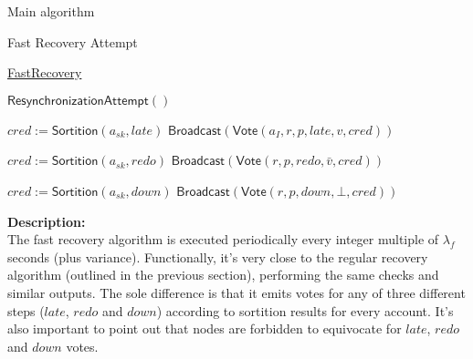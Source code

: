 \documentclass[10pt,a4paper]{article}
\begin{document}
\begin{section}{Main algorithm}
\begin{subsection}{Fast Recovery Attempt}
    \begin{algorithm}[H]
        \caption{\underline{FastRecovery}}
        \label{algo:fast-recovery}
        \begin{algorithmic}[1]


        \State $\mathsf{ResynchronizationAttempt}()$
    
                \State $cred := 
                \mathsf{Sortition}(a_{sk}, late)$
                    \State $\mathsf{Broadcast}(\mathsf{Vote}(a_I, r, p, late, v, cred))$
                \EndIf

                    \State $cred := 
                    \mathsf{Sortition}(a_{sk}, redo)$
                        \State $\mathsf{Broadcast}(\mathsf{Vote}(r,p,redo,\bar{v}, cred))$
                    \EndIf

            \Else
                \State $cred := 
                \mathsf{Sortition}(a_{sk}, down)$
                    \State $\mathsf{Broadcast}(\mathsf{Vote}(r,p,down,\bot, cred))$
                \EndIf
            \EndIf
        \EndFor

        \EndFunction
        \end{algorithmic}
    \end{algorithm}
    
    
    \noindent \textbf{Description:}\\
    The fast recovery algorithm is executed periodically every integer multiple of $\lambda_f$
    seconds (plus variance).
    Functionally, it's very close to the regular recovery algorithm (outlined in the previous section), 
    performing the same checks and similar outputs. The sole difference is that it emits votes 
    for any of three different steps ($late$, $redo$ and $down$) according to sortition 
    results for every account.
    It's also important to point out that nodes are forbidden to equivocate for $late$, $redo$ and $down$ votes.
\end{subsection}


\end{section}
\end{document}
